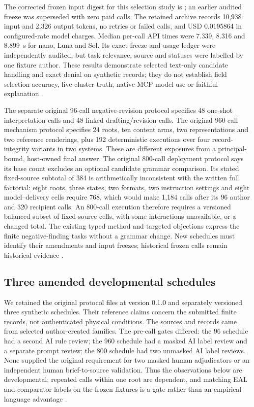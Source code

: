 \documentclass[preprint,12pt]{elsarticle}
\begin{document}
The corrected frozen input digest for this selection study is ; an earlier audited freeze was superseded with zero paid calls. The retained archive records 10,938 input and 2,326 output tokens, no retries or failed calls, and USD 0.0195864 in configured-rate model charges. Median per-call API times were 7.339, 8.316 and 8.899~s for nano, Luna and Sol. Its exact freeze and usage ledger were independently audited, but task relevance, source and statuses were labelled by one fixture author. These results demonstrate selected text-only candidate handling and exact denial on synthetic records; they do not establish field selection accuracy, live cluster truth, native MCP model use or faithful explanation \citep{earlFamilySelection}.

The separate original 96-call negative-revision protocol specifies 48 one-shot interpretation calls and 48 linked drafting/revision calls. The original 960-call mechanism protocol specifies 24 roots, ten content arms, two representations and two reference renderings, plus 192 deterministic executions over four record-integrity variants in two systems. These are different exposures from a principal-bound, host-owned final answer. The original 800-call deployment protocol says its base count excludes an optional candidate grammar comparison. Its stated fixed-source subtotal of 384 is arithmetically inconsistent with the written full factorial: eight roots, three states, two formats, two instruction settings and eight model--delivery cells require 768, which would make 1,184 calls after its 96 author and 320 recipient calls. An 800-call execution therefore requires a versioned balanced subset of fixed-source cells, with some interactions unavailable, or a changed total. The existing typed method and targeted objections express the finite negative-finding tasks without a grammar change. New schedules must identify their amendments and input freezes; historical frozen calls remain historical evidence \citep{earlProposals,earlAmendment}.

\subsection{Three amended developmental schedules}
We retained the original protocol files at version 0.1.0 and separately versioned three synthetic schedules. Their reference claims concern the submitted finite records, not authenticated physical conditions. The sources and records came from selected author-created families. The pre-call gates differed: the 96 schedule had a second AI rule review; the 960 schedule had a masked AI label review and a separate prompt review; the 800 schedule had two unmasked AI label reviews. None supplied the original requirement for two masked human adjudicators or an independent human brief-to-source validation. Thus the observations below are developmental; repeated calls within one root are dependent, and matching EAL and comparator labels on the frozen fixtures is a gate rather than an empirical language advantage \citep{earlThreeStudyMethods}.
\end{document}
